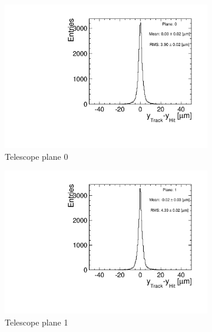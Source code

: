 \begin{figure}[htbp] \centering
  \begin{subfigure}[b]{0.3\textwidth}
    \includegraphics[width=\textwidth]{figures/Telescope/biasedResiduals/BiasedResiduals_run49_PlaneYRMS0.pdf}
    \caption{Telescope plane 0}
  \end{subfigure}\hfill
  \begin{subfigure}[b]{0.3\textwidth}
    \includegraphics[width=\textwidth]{figures/Telescope/biasedResiduals/BiasedResiduals_run49_PlaneYRMS1.pdf}
    \caption{Telescope plane 1}
  \end{subfigure}\hfill
  \begin{subfigure}[b]{0.3\textwidth}

\end{subfigure}
\end{figure}
